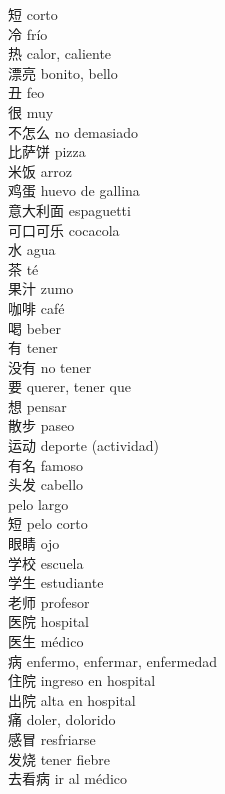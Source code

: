 短 \quad corto\\
冷 \quad frío\\
热 \quad calor, caliente\\
漂亮 \quad bonito, bello\\
丑 \quad feo\\
很 \quad muy\\
不怎么 \quad no demasiado\\
比萨饼 \quad pizza\\
米饭 \quad arroz\\
鸡蛋 \quad huevo de gallina\\
意大利面 \quad espaguetti\\
可口可乐 \quad cocacola\\
水 \quad agua\\
茶 \quad té\\
果汁 \quad zumo\\
咖啡 \quad café\\
喝 \quad beber\\
有 \quad tener\\
没有 \quad no tener\\
要 \quad querer, tener que\\
想 \quad pensar\\
散步 \quad paseo\\
运动 \quad deporte (actividad)\\
有名 \quad famoso\\
头发 \quad cabello\\
 \quad pelo largo\\
短 \quad pelo corto\\
眼睛 \quad ojo\\
学校 \quad escuela\\
学生 \quad estudiante\\
老师 \quad profesor\\
医院 \quad hospital\\
医生 \quad médico\\
病 \quad enfermo, enfermar, enfermedad\\
住院 \quad ingreso en hospital\\
出院 \quad alta en hospital\\
痛 \quad doler, dolorido\\
感冒 \quad resfriarse\\
发烧 \quad tener fiebre\\
去看病 \quad ir al médico\\
